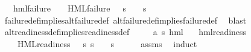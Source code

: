 \begin{isabellebody}
\ \ {\isachardoublequoteopen}{\isasymforall}{\isasymphi}{\isachardot}{\kern0pt}\ {\isacharparenleft}{\kern0pt}hml{\isacharunderscore}{\kern0pt}failure\ {\isasymphi}\ {\isasymlongrightarrow}\ {\isacharparenleft}{\kern0pt}{\isasymexists}{\isasympsi}{\isachardot}{\kern0pt}\ HML{\isacharunderscore}{\kern0pt}failure\ {\isasympsi}\ {\isasymand}\ {\isacharparenleft}{\kern0pt}s\ {\isasymTurnstile}\ {\isasympsi}\ {\isasymlongleftrightarrow}\ s\ {\isasymTurnstile}\ {\isasymphi}{\isacharparenright}{\kern0pt}{\isacharparenright}{\kern0pt}{\isacharparenright}{\kern0pt}{\isachardoublequoteclose}\isanewline
%
\isadelimproof
\ \ %
\endisadelimproof
%
\isatagproof
{}\isamarkupfalse%
\ failure{\isacharunderscore}{\kern0pt}def{\isacharunderscore}{\kern0pt}implies{\isacharunderscore}{\kern0pt}alt{\isacharunderscore}{\kern0pt}failure{\isacharunderscore}{\kern0pt}def\ alt{\isacharunderscore}{\kern0pt}failure{\isacharunderscore}{\kern0pt}def{\isacharunderscore}{\kern0pt}implies{\isacharunderscore}{\kern0pt}failure{\isacharunderscore}{\kern0pt}def\ \isamarkupfalse%
\ blast{\isacharplus}{\kern0pt}%
\endisatagproof
{\isafoldproof}%
%
\isadelimproof
\isanewline
%
\endisadelimproof
\isanewline
{}\isamarkupfalse%
\ alt{\isacharunderscore}{\kern0pt}readiness{\isacharunderscore}{\kern0pt}def{\isacharunderscore}{\kern0pt}implies{\isacharunderscore}{\kern0pt}readiness{\isacharunderscore}{\kern0pt}def{\isacharcolon}{\kern0pt}\isanewline
\ \ \ {\isasymphi}\ {\isacharcolon}{\kern0pt}{\isacharcolon}{\kern0pt}\ {\isachardoublequoteopen}{\isacharparenleft}{\kern0pt}{\isacharprime}{\kern0pt}a{\isacharcomma}{\kern0pt}\ {\isacharprime}{\kern0pt}s{\isacharparenright}{\kern0pt}\ hml{\isachardoublequoteclose}\isanewline
\ \ \ {\isachardoublequoteopen}hml{\isacharunderscore}{\kern0pt}readiness\ {\isasymphi}{\isachardoublequoteclose}\isanewline
\ \ \ {\isachardoublequoteopen}{\isasymexists}{\isasympsi}{\isachardot}{\kern0pt}\ HML{\isacharunderscore}{\kern0pt}readiness\ {\isasympsi}\ {\isasymand}\ {\isacharparenleft}{\kern0pt}{\isasymforall}s{\isachardot}{\kern0pt}\ {\isacharparenleft}{\kern0pt}s\ {\isasymTurnstile}\ {\isasymphi}{\isacharparenright}{\kern0pt}\ {\isasymlongleftrightarrow}\ {\isacharparenleft}{\kern0pt}s\ {\isasymTurnstile}\ {\isasympsi}{\isacharparenright}{\kern0pt}{\isacharparenright}{\kern0pt}{\isachardoublequoteclose}\isanewline
%
\isadelimproof
\ \ %
\endisadelimproof
%
\isatagproof
{}\isamarkupfalse%
\ assms\ \isamarkupfalse%
\ induct\isanewline

\end{isabellebody}
